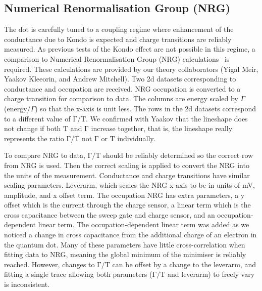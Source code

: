 \subsection{Numerical Renormalisation Group (NRG)}
The dot is carefully tuned to a coupling regime where enhancement of the conductance due to Kondo is expected and charge transitions are reliably measured. As previous tests of the Kondo effect are not possible in this regime, a comparison to Numerical Renormalisation Group (NRG) calculations~\cite{nrg} is required. These calculations are provided by our theory collaborators (Yigal Meir, Yaakov Kleeorin, and Andrew Mitchell). 
Two 2d datasets corresponding to conductance and occupation are received. NRG occupation is converted to a charge transition for comparison to data. The columns are energy scaled by $\Gamma$ (energy/$\Gamma$) so that the x-axis is unit less. The rows in the 2d datasets correspond to a different value of $\mathrm{\Gamma/T}$. We confirmed with Yaakov that the lineshape does not change if both $\mathrm{T}$ and $\mathrm{\Gamma}$ increase together, that is, the lineshape really represents the ratio $\mathrm{\Gamma/T}$ not $\mathrm{\Gamma}$ or $\mathrm{T}$ individually.

To compare NRG to data, $\mathrm{\Gamma/T}$ should be reliably determined so the correct row from NRG is used. Then the correct scaling is applied to convert the NRG into the units of the measurement. Conductance and charge transitions have similar scaling parameters. Leverarm, which scales the NRG x-axis to be in units of mV, amplitude, and x offset term. The occupation NRG has extra parameters, a y offset which is the current through the charge sensor, a linear term which is the cross capacitance between the sweep gate and charge sensor, and an occupation-dependent linear term. The occupation-dependent linear term was added as we noticed a change in cross capacitance from the additional charge of an electron in the quantum dot. Many of these parameters have little cross-correlation when fitting data to NRG, meaning the global minimum of the minimiser is reliably reached. However, changes to $\mathrm{\Gamma/T}$ can be offset by a change to the leverarm, and fitting a single trace allowing both parameters ($\mathrm{\Gamma/T}$ and leverarm) to freely vary is inconsistent. 

